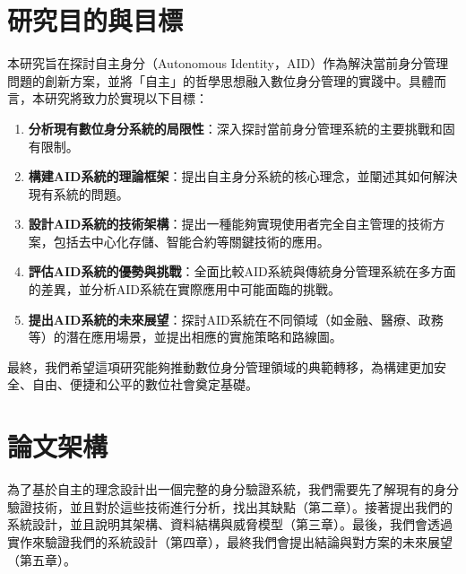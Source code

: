 \section{研究目的與目標}
本研究旨在探討自主身分（Autonomous Identity，AID）作為解決當前身分管理問題的創新方案，並將「自主」的哲學思想融入數位身分管理的實踐中。具體而言，本研究將致力於實現以下目標：
\begin{enumerate}
  \item \textbf{分析現有數位身分系統的局限性}：深入探討當前身分管理系統的主要挑戰和固有限制。
  \item \textbf{構建AID系統的理論框架}：提出自主身分系統的核心理念，並闡述其如何解決現有系統的問題。
  \item \textbf{設計AID系統的技術架構}：提出一種能夠實現使用者完全自主管理的技術方案，包括去中心化存儲、智能合約等關鍵技術的應用。
  \item \textbf{評估AID系統的優勢與挑戰}：全面比較AID系統與傳統身分管理系統在多方面的差異，並分析AID系統在實際應用中可能面臨的挑戰。
  \item \textbf{提出AID系統的未來展望}：探討AID系統在不同領域（如金融、醫療、政務等）的潛在應用場景，並提出相應的實施策略和路線圖。
\end{enumerate}
最終，我們希望這項研究能夠推動數位身分管理領域的典範轉移，為構建更加安全、自由、便捷和公平的數位社會奠定基礎。
\section{論文架構}
為了基於自主的理念設計出一個完整的身分驗證系統，我們需要先了解現有的身分驗證技術，並且對於這些技術進行分析，找出其缺點（第二章）。接著提出我們的系統設計，並且說明其架構、資料結構與威脅模型（第三章）。最後，我們會透過實作來驗證我們的系統設計（第四章），最終我們會提出結論與對方案的未來展望（第五章）。